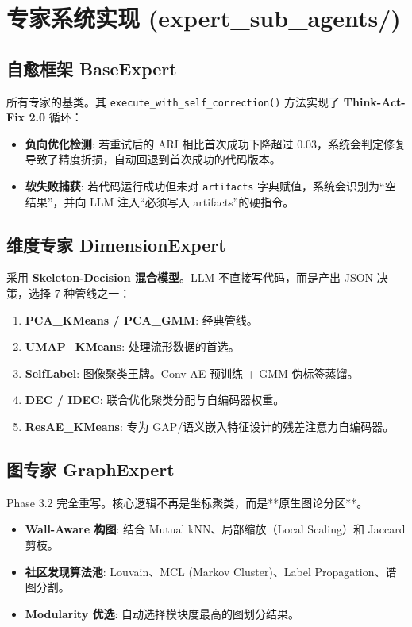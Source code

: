 \documentclass[12pt,a4paper]{article}
\begin{document}
\newpage

\section{专家系统实现 (expert\_sub\_agents/)}

\subsection{自愈框架 BaseExpert}

所有专家的基类。其 \texttt{execute\_with\_self\_correction()} 方法实现了 \textbf{Think-Act-Fix 2.0} 循环：

\begin{itemize}
    \item \textbf{负向优化检测}: 若重试后的 ARI 相比首次成功下降超过 0.03，系统会判定修复导致了精度折损，自动回退到首次成功的代码版本。
    \item \textbf{软失败捕获}: 若代码运行成功但未对 \texttt{artifacts} 字典赋值，系统会识别为“空结果”，并向 LLM 注入“必须写入 artifacts”的硬指令。
\end{itemize}

\subsection{维度专家 DimensionExpert}

采用 \textbf{Skeleton-Decision 混合模型}。LLM 不直接写代码，而是产出 JSON 决策，选择 7 种管线之一：
\begin{enumerate}[nosep]
    \item \textbf{PCA\_KMeans / PCA\_GMM}: 经典管线。
    \item \textbf{UMAP\_KMeans}: 处理流形数据的首选。
    \item \textbf{SelfLabel}: 图像聚类王牌。Conv-AE 预训练 + GMM 伪标签蒸馏。
    \item \textbf{DEC / IDEC}: 联合优化聚类分配与自编码器权重。
    \item \textbf{ResAE\_KMeans}: 专为 GAP/语义嵌入特征设计的残差注意力自编码器。
\end{enumerate}

\subsection{图专家 GraphExpert}

Phase 3.2 完全重写。核心逻辑不再是坐标聚类，而是**原生图论分区**。
\begin{itemize}
    \item \textbf{Wall-Aware 构图}: 结合 Mutual kNN、局部缩放（Local Scaling）和 Jaccard 剪枝。
    \item \textbf{社区发现算法池}: Louvain、MCL (Markov Cluster)、Label Propagation、谱图分割。
    \item \textbf{Modularity 优选}: 自动选择模块度最高的图划分结果。
\end{itemize}
\end{document}
